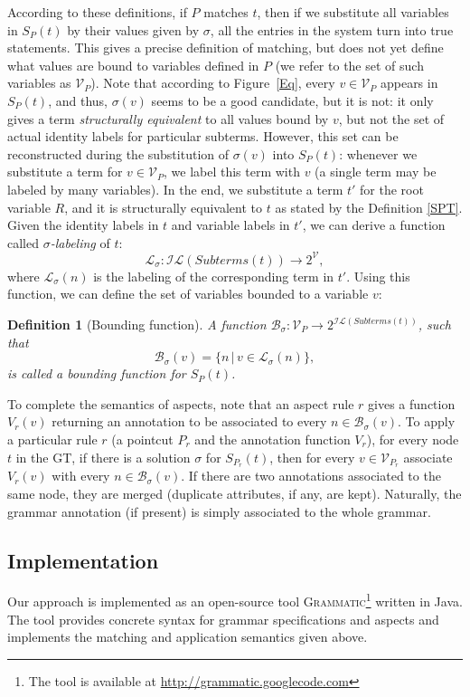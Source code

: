 \documentclass{IOS-Book-Article}     %
\newtheorem{Def}{Definition}
\newcommand{\figref}[1]{Figure~\ref{#1}}
\newcommand{\tool}[1]{\textsc{#1}}
\newcommand{\Grammatic}[0]{\tool{Grammatic}}
\begin{document}
According to these definitions, if $P$ matches $t$, then if we substitute all variables in $S_P(t)$ by their values given by $\sigma$, all the entries in the system turn into true statements. This gives a precise definition of matching, but does not yet define what values are bound to variables defined in $P$ (we refer to the set of such variables as $\mathcal{V}_P$). Note that according to \figref{Eq}, every $v \in \mathcal{V}_P$ appears in $S_P(t)$, and thus, $\sigma(v)$ seems to be a good candidate, but it is not: it only gives a term \emph{structurally equivalent} to all values bound by $v$, but not the set of actual identity labels for particular subterms. However, this set can be reconstructed during the substitution of $\sigma(v)$ into $S_P(t)$: whenever we substitute a term for $v \in \mathcal{V}_P$, we label this term with $v$ (a single term may be labeled by many variables). In the end, we substitute a term $t'$ for the root variable $R$, and it is structurally equivalent to $t$ as stated by the Definition \ref{SPT}. Given the identity labels in $t$ and variable labels in $t'$, we can derive a function called \emph{$\sigma$-labeling} of $t$:
$$\mathcal{L}_\sigma : \mathcal{IL}(Subterms(t)) \rightarrow 2^{\mathcal{V}},$$
where $\mathcal{L}_\sigma(n)$ is the labeling of the corresponding term in $t'$. Using this function, we can define the set of variables bounded to a variable $v$:
\begin{Def}[Bounding function]
A function $\mathcal{B}_\sigma : \mathcal{V}_P \rightarrow 2^{\mathcal{IL}(Subterms(t))}$, such that $$\mathcal{B}_\sigma(v) = \{n \,|\, v \in \mathcal{L}_\sigma(n)\},$$
is called a \emph{bounding function} for $S_P(t)$.
\end{Def}

To complete the semantics of aspects, note that an aspect rule $r$ gives a function $V_r(v)$ returning an annotation to be associated to every $n \in \mathcal{B}_\sigma(v)$. To apply a particular rule $r$ (a pointcut $P_r$ and the annotation function $V_r$), for every node $t$ in the GT, if there is a solution $\sigma$ for $S_{P_r}(t)$, then for every $v \in \mathcal{V}_{P_r}$ associate $V_r(v)$ with every $n \in \mathcal{B}_\sigma(v)$. If there are two annotations associated to the same node, they are merged (duplicate attributes, if any, are kept). Naturally, the grammar annotation (if present) is simply associated to the whole grammar.

\subsection{Implementation}
Our approach is implemented as an open-source tool \Grammatic{}\footnote{The tool is available at \url{http://grammatic.googlecode.com}} written in Java. The tool provides concrete syntax for grammar specifications and aspects and implements the matching and application semantics given above. 
\end{document}
